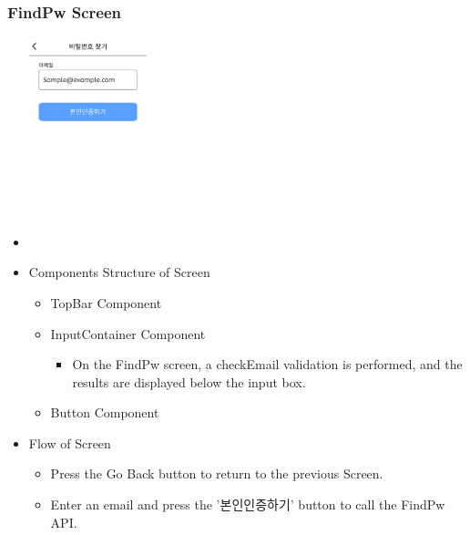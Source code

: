 \documentclass[conference]{IEEEtran}
\begin{document}
\subsubsection{FindPw Screen}
\begin{itemize}
    \item[] \includegraphics[width=0.27\textwidth]{img/D/7.png}
    \item Components Structure of Screen
    \begin{itemize}
        \item TopBar Component
        \item InputContainer Component
        \begin{itemize}
            \item On the FindPw screen, a checkEmail validation is performed, and the results are displayed below the input box.
        \end{itemize}
        \item Button Component
    \end{itemize}
    \item Flow of Screen
    \begin{itemize}
        \item Press the Go Back button to return to the previous Screen.
        \item Enter an email and press the '본인인증하기' button to call the FindPw API.
        \\
    \end{itemize}
\end{itemize}
\newpage
\end{document}
